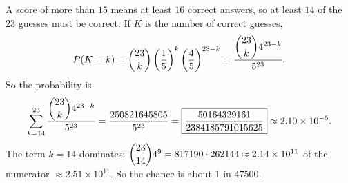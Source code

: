 A score of more than $15$ means at least $16$ correct answers, so at least $14$ of the $23$ guesses must be correct. If $K$ is the number of correct guesses,
\[P(K=k)=\dbinom{23}{k}\left(\dfrac15\right)^k\left(\dfrac45\right)^{23-k}=\dfrac{\dbinom{23}{k}4^{23-k}}{5^{23}}.\]
So the probability is
\[\sum_{k=14}^{23}\dfrac{\dbinom{23}{k}4^{23-k}}{5^{23}}=\dfrac{250821645805}{5^{23}}=\boxed{\dfrac{50164329161}{2384185791015625}}\approx2.10\times10^{-5}.\]
The term $k=14$ dominates: $\dbinom{23}{14}4^9=817190\cdot262144\approx2.14\times10^{11}$ of the numerator $\approx2.51\times10^{11}$. So the chance is about $1$ in $47500$.
